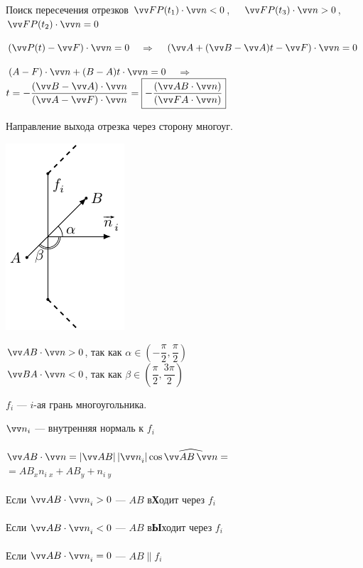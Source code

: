 \documentclass[10pt]{beamer}
\begin{document}
\begin{frame}{Поиск пересечения отрезков}
		$\VV{FP(t_1)}\cdot\VV n < 0$, \ \ $\VV{FP(t_3)}\cdot\VV n > 0$, \ \ $\VV{FP(t_2)}\cdot\VV n = 0$ \\[0.5em] \pause
		
		$(\VV{P(t)}-\VV{F})\cdot\vv n = 0$ \ $\Rightarrow$ \  $(\VV A+(\VV B-\VV A)t-\VV F)\cdot\VV n = 0$ \\[0.5em] \pause
		
		$(A-F)\cdot \VV n + (B-A)t \cdot \VV n = 0$  \ $\Rightarrow$ \  
		$t=-\dfrac{(\VV B-\VV A)\cdot\VV n}{(\VV A-\VV F)\cdot\VV n} =  \boxed{-\dfrac{(\VV{AB}\cdot\VV n )}{(\VV{FA}\cdot\VV n)} }$ 
		
				
		
	\end{frame}
	
	\begin{frame}{Направление выхода отрезка через сторону многоуг.}
		{
			\centering
			\includegraphics{cirus_case2.pdf}
			
			$\VV{AB}\cdot\VV n > 0 $, так как $\alpha \in \left( -\dfrac{\pi}{2},\dfrac{\pi}{2}\right)$ \\[0.5em]
			
			$\VV{BA}\cdot\VV n < 0 $, так как $\beta \in \left( \dfrac{\pi}{2},\dfrac{3\pi}{2}\right)$
		}
		{
			$f_i$ --- $i$-ая грань  многоугольника.
			
			$\vv n_i$ --- внутренняя нормаль к  $f_i$ \\ ~ \\
			
			$\VV{AB} \cdot \VV n = \abs{\VV{AB}} \abs{\VV n_i} \cos \widehat{\VV{AB}\,\VV n}={}$\\			
			\hfill $=AB_x n_i\,_x+AB_y+n_i\,_y$ \\ ~ \\
			
			Если $\VV{AB} \cdot \VV n_i > 0$ --- $AB$ в\textbf{Х}одит через $f_i$ \\~\\
			Если $\VV{AB} \cdot \VV n_i < 0$ --- $AB$ в\textbf{Ы}ходит через $f_i$ \\ ~ \\
			Если $\VV{AB} \cdot \VV n_i = 0$ --- $AB \parallel f_i$ 
		}
	\end{frame}
\end{document}
